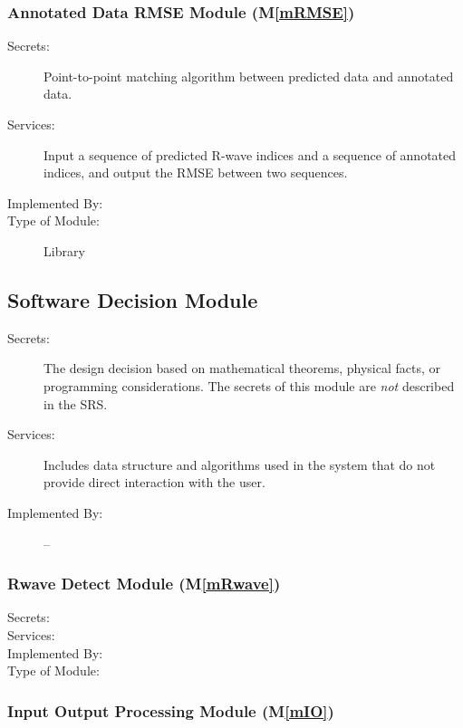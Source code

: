 \documentclass[12pt, titlepage]{article}
\newcommand{\mref}[1]{M\ref{#1}}
\begin{document}
\subsubsection{Annotated Data RMSE Module (\mref{mRMSE})}

\begin{description}
\item[Secrets:]Point-to-point matching algorithm between predicted data and
annotated data.
\item[Services:]Input a sequence of predicted R-wave indices and a sequence of
annotated indices, and output the RMSE between two sequences.
\item[Implemented By:] \progname
\item[Type of Module:] Library
\end{description}


\subsection{Software Decision Module}

\begin{description}
\item[Secrets:] The design decision based on mathematical theorems, physical
  facts, or programming considerations. The secrets of this module are
  \emph{not} described in the SRS.
\item[Services:] Includes data structure and algorithms used in the system that
  do not provide direct interaction with the user. 
\item[Implemented By:] --
\end{description}

\subsubsection{Rwave Detect Module (\mref{mRwave})}

\begin{description}
\item[Secrets:]
\item[Services:]
\item[Implemented By:] \progname
\item[Type of Module:]
\end{description}

\subsubsection{Input Output Processing Module (\mref{mIO})}
\end{document}
